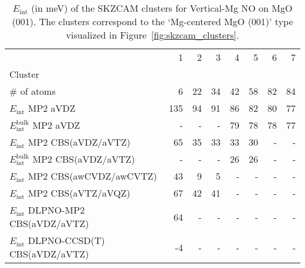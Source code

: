 \begin{table}
\caption{\label{tab:system_eint_mgo_no_vertical-mg}$E_\textrm{int}$ (in meV) of the SKZCAM clusters for Vertical-Mg NO on MgO (001). The clusters correspond to the `Mg-centered MgO (001)' type visualized in Figure~\ref{fig:skzcam_clusters}.}
\begin{adjustbox}{center,max width=1.4\textwidth}
\begin{tabular}{lrrrrrrr}
\toprule
 & 1 & 2 & 3 & 4 & 5 & 6 & 7 \\ 
Cluster &  &  &  &  &  &  &  \\
\midrule
\# of atoms & 6 & 22 & 34 & 42 & 58 & 82 & 84 \\
$E_\textrm{int}$ MP2 aVDZ & 135 & 94 & 91 & 86 & 82 & 80 & 77 \\
$E_\textrm{int}^\textrm{bulk}$ MP2 aVDZ & - & - & - & 79 & 78 & 78 & 77 \\
$E_\textrm{int}$ MP2 CBS(aVDZ/aVTZ) & 65 & 35 & 33 & 33 & 30 & - & - \\
$E_\textrm{int}^\textrm{bulk}$ MP2 CBS(aVDZ/aVTZ) & - & - & - & 26 & 26 & - & - \\
$E_\textrm{int}$ MP2 CBS(awCVDZ/awCVTZ) & 43 & 9 & 5 & - & - & - & - \\
$E_\textrm{int}$ MP2 CBS(aVTZ/aVQZ) & 67 & 42 & 41 & - & - & - & - \\
$E_\textrm{int}$ DLPNO-MP2 CBS(aVDZ/aVTZ) & 64 & - & - & - & - & - & - \\
$E_\textrm{int}$ DLPNO-CCSD(T) CBS(aVDZ/aVTZ) & -4 & - & - & - & - & - & - \\
\bottomrule
\end{tabular}
\end{adjustbox}
\end{table}

